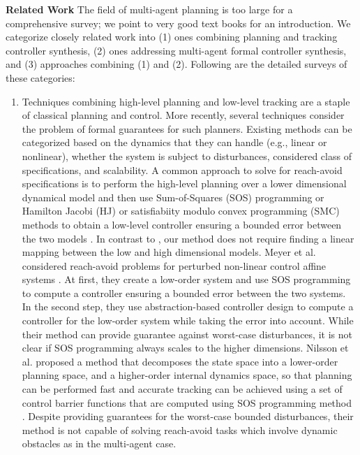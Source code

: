 \smallskip
\noindent\textbf{Related Work}
%
The field of multi-agent planning is too large for a comprehensive survey; we point to very good text books
\cite{LaValle2006,LaValle1998planning,choset2005principles,russel2010AIplanning} for an introduction.
We categorize closely related work into (1) ones combining planning and tracking controller synthesis, 
(2) ones addressing multi-agent formal controller synthesis, and 
(3) approaches combining (1) and (2).
Following are the detailed surveys of these categories:

\begin{enumerate}[(1)]
	\item Techniques combining high-level planning and low-level tracking are a staple of classical planning and control. 
More recently, several techniques consider the problem of formal guarantees for such planners.
Existing methods can be categorized based on the dynamics that they can handle (e.g., linear or nonlinear),
whether the system is subject to disturbances, considered class of specifications, and scalability. 
A common approach to solve for reach-avoid specifications is to perform the high-level planning over a lower dimensional dynamical model and then use
Sum-of-Squares (SOS) programming or Hamilton Jacobi (HJ) or satisfiabiity modulo convex programming (SMC) methods to obtain a low-level controller ensuring a bounded error between the 
two models \cite{herbert2017fastrack,meyer2019,singh2018robust,Nilsson:2018}. 
In contrast to \cite{herbert2017fastrack,singh2018robust}, our method does not require finding 
a linear mapping between the low and high dimensional models. Meyer et al. considered reach-avoid problems for perturbed non-linear control affine systems \cite{meyer2019}. At first, they create a low-order system and use SOS programming to compute a controller ensuring a bounded error between the two systems. In the second step, they use abstraction-based controller design to compute a controller for the low-order system while taking the error into account. While their method can provide guarantee against worst-case disturbances, it is not clear if SOS programming always scales to the higher dimensions. 
Nilsson et al.  proposed a method that decomposes the state space into a lower-order planning space, and a higher-order internal dynamics space, so that planning can be performed fast and accurate tracking can be achieved using a set of control barrier functions that are computed using SOS programming method \cite{Nilsson:2018}. Despite providing guarantees for the worst-case bounded disturbances, their method is not capable of solving reach-avoid tasks which involve dynamic obstacles as in the multi-agent case.

\end{enumerate}
